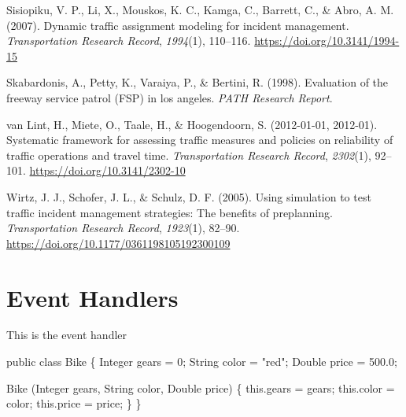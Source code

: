 \documentclass[fancy, oneside, mastersfancy, ms]{byuthesis}
\newenvironment{Shaded}{\begin{snugshade}}{\end{snugshade}}
\newcommand{\BuiltInTok}[1]{\textcolor[rgb]{0.00,0.23,0.31}{#1}}
\newcommand{\DecValTok}[1]{\textcolor[rgb]{0.68,0.00,0.00}{#1}}
\newcommand{\FloatTok}[1]{\textcolor[rgb]{0.68,0.00,0.00}{#1}}
\newcommand{\FunctionTok}[1]{\textcolor[rgb]{0.28,0.35,0.67}{#1}}
\newcommand{\KeywordTok}[1]{\textcolor[rgb]{0.00,0.23,0.31}{#1}}
\newcommand{\NormalTok}[1]{\textcolor[rgb]{0.00,0.23,0.31}{#1}}
\newcommand{\OperatorTok}[1]{\textcolor[rgb]{0.37,0.37,0.37}{#1}}
\newcommand{\StringTok}[1]{\textcolor[rgb]{0.13,0.47,0.30}{#1}}
\newlength{\cslhangindent}
\newlength{\cslentryspacingunit} %
\newenvironment{CSLReferences}[2] %
 {%
  \setlength{\parindent}{0pt}
  \ifodd #1
  \let\oldpar\par
  \def\par{\hangindent=\cslhangindent\oldpar}
  \fi
  \setlength{\parskip}{#2\cslentryspacingunit}
 }%
 {}
\begin{document}
\begin{CSLReferences}{1}{0}
\leavevmode{}%
Sisiopiku, V. P., Li, X., Mouskos, K. C., Kamga, C., Barrett, C., \&
Abro, A. M. (2007). Dynamic traffic assignment modeling for incident
management. \emph{Transportation Research Record}, \emph{1994}(1),
110--116. \url{https://doi.org/10.3141/1994-15}

\leavevmode{}%
Skabardonis, A., Petty, K., Varaiya, P., \& Bertini, R. (1998).
Evaluation of the freeway service patrol ({FSP}) in los angeles.
\emph{PATH Research Report}.

\leavevmode{}%
van Lint, H., Miete, O., Taale, H., \& Hoogendoorn, S. (2012-01-01,
2012-01). Systematic framework for assessing traffic measures and
policies on reliability of traffic operations and travel time.
\emph{Transportation Research Record}, \emph{2302}(1), 92--101.
\url{https://doi.org/10.3141/2302-10}

\leavevmode{}%
Wirtz, J. J., Schofer, J. L., \& Schulz, D. F. (2005). Using simulation
to test traffic incident management strategies: {The} benefits of
preplanning. \emph{Transportation Research Record}, \emph{1923}(1),
82--90. \url{https://doi.org/10.1177/0361198105192300109}

\end{CSLReferences}

\cleardoublepage
{}
{}
\appendix

\hypertarget{event-handlers}{%
\chapter{Event Handlers}\label{event-handlers}}

This is the event handler

\begin{Shaded}
\begin{Highlighting}[]
\KeywordTok{public} \KeywordTok{class}\NormalTok{ Bike }\OperatorTok{\{}
    \BuiltInTok{Integer}\NormalTok{ gears }\OperatorTok{=} \DecValTok{0}\OperatorTok{;}
    \BuiltInTok{String}\NormalTok{ color }\OperatorTok{=} \StringTok{"red"}\OperatorTok{;}
    \BuiltInTok{Double}\NormalTok{ price }\OperatorTok{=} \FloatTok{500.0}\OperatorTok{;}

    \FunctionTok{Bike} \OperatorTok{(}\BuiltInTok{Integer}\NormalTok{ gears}\OperatorTok{,} \BuiltInTok{String}\NormalTok{ color}\OperatorTok{,} \BuiltInTok{Double}\NormalTok{ price}\OperatorTok{)} \OperatorTok{\{}
        \KeywordTok{this}\OperatorTok{.}\FunctionTok{gears} \OperatorTok{=}\NormalTok{ gears}\OperatorTok{;}
        \KeywordTok{this}\OperatorTok{.}\FunctionTok{color} \OperatorTok{=}\NormalTok{ color}\OperatorTok{;}
        \KeywordTok{this}\OperatorTok{.}\FunctionTok{price} \OperatorTok{=}\NormalTok{ price}\OperatorTok{;}
    \OperatorTok{\}}
\OperatorTok{\}}
\end{Highlighting}
\end{Shaded}
\end{document}
